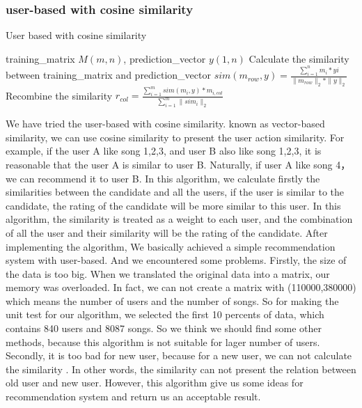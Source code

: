 \documentclass{article}
\begin{document}
\subsubsection{user-based with cosine similarity}
\begin{algorithm}[tb]
   \caption{User based with cosine similarity}
   \label{alg:example}
\begin{algorithmic}
    training\_matrix $M(m,n)$, prediction\_vector $y(1,n)$
   \STATE Calculate the similarity between training\_matrix and prediction\_vector
   \STATE $sim(m_{row},y) = \frac{\sum^{n}_{i = 1}m_{i}*y{i}}{\|m_{row}\|_{2}*\|y\|_{2}}$
   \ENDFOR
   \STATE Recombine the similarity
   \STATE $r_{col}=\frac{\sum_{i=1}^{m}sim(m_{i},y)*m_{i,col}}{\sum_{i=1}^{m} \|sim_{i}\|_{2}}$
   \ENDFOR
\end{algorithmic}
\end{algorithm}
We have tried the user-based with cosine similarity. known as vector-based similarity, we can use  cosine similarity to present the user action similarity. For example, if the user A like song 1,2,3, and user B also like song 1,2,3, it is reasonable that the user A is similar to user B. Naturally, if user A like  song 4， we can recommend it to user B.  In this algorithm, we calculate firstly the similarities between the candidate and all the  users, if the user  is  similar to the candidate,  the rating of the candidate will be more similar to this user.  In this algorithm, the similarity is treated as a weight to each user, and  the combination of all the user and their similarity will be the rating of the candidate.
After implementing the algorithm, We basically achieved a simple recommendation system with user-based. And we encountered some problems. Firstly, the size of the data is too big. When we translated the original data into a matrix, our memory was overloaded. In fact, we can not create a matrix with (110000,380000) which means the number of users and the number of songs. So for making the unit test for our algorithm, we selected the first 10 percents of data, which contains 840 users and 8087 songs.  So we think we should find some other methods, because this algorithm is not suitable for lager number of users. Secondly, it is  too bad for new user, because for a new user, we can not calculate the similarity . In other words, the similarity can not present the relation between old user and new user. However, this algorithm give us some ideas for recommendation system and return us an acceptable result.
\end{document}
